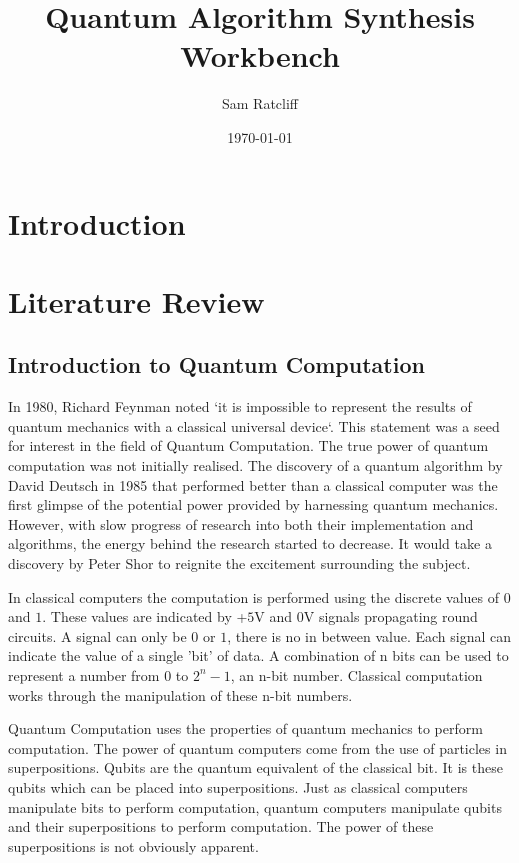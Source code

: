 \documentclass[authoryearcitations]{UoYCSproject}
\author{Sam Ratcliff}
\title{Quantum Algorithm Synthesis Workbench}
\date{\today}
\begin{document}
\maketitle
 
\chapter{Introduction}
\chapter{Literature Review}
\section{Introduction to Quantum Computation}
In 1980, Richard Feynman noted `it is impossible to represent the results of quantum mechanics with a classical universal device`\cite{Feynman82simulatingphysics}.
This statement was a seed for interest in the field of Quantum Computation.
The true power of quantum computation was not initially realised.
The discovery of a quantum algorithm by David Deutsch\cite{Deutsch1985} in 1985 that performed better than a classical computer was the first glimpse of the potential power provided by harnessing quantum mechanics.
However, with slow progress of research into both their implementation and algorithms, the energy behind the research started to decrease.
It would take a discovery by Peter Shor\cite{Shor:1994jg} to reignite the excitement surrounding the subject.  

In classical computers the computation is performed using the discrete values of $0$ and $1$.
These values are indicated by +$5$V and $0$V signals propagating round circuits.
A signal can only be $0$ or $1$, there is no in between value.
Each signal can indicate the value of a single 'bit' of data.
A combination of n bits can be used to represent a number from $0$ to $2^n-1$, an n-bit number.
Classical computation works through the manipulation of these n-bit numbers.


Quantum Computation uses the properties of quantum mechanics to perform computation.
The power of quantum computers come from the use of particles in superpositions.
Qubits are the quantum equivalent of the classical bit.
It is these qubits which can be placed into superpositions.
Just as classical computers manipulate bits to perform computation, quantum computers manipulate qubits and their superpositions to perform computation.
The power of these superpositions is not obviously apparent.
\end{document}
